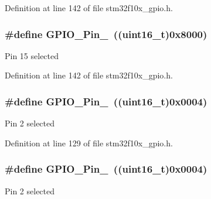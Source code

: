 Definition at line 142 of file stm32f10x\+\_\+gpio.\+h.

\subsubsection[{\texorpdfstring{G\+P\+I\+O\+\_\+\+Pin\+\_\+15}{GPIO_Pin_15}}]{\setlength{\rightskip}{0pt plus 5cm}\#define G\+P\+I\+O\+\_\+\+Pin\+\_~(({\bf uint16\+\_\+t})0x8000)}\hypertarget{group___g_p_i_o__pins__define_gae686a9fc47cf3e420e5db0784210711d}{}\label{group___g_p_i_o__pins__define_gae686a9fc47cf3e420e5db0784210711d}
Pin 15 selected 

Definition at line 142 of file stm32f10x\+\_\+gpio.\+h.

\subsubsection[{\texorpdfstring{G\+P\+I\+O\+\_\+\+Pin\+\_\+2}{GPIO_Pin_2}}]{\setlength{\rightskip}{0pt plus 5cm}\#define G\+P\+I\+O\+\_\+\+Pin\+\_~(({\bf uint16\+\_\+t})0x0004)}\hypertarget{group___g_p_i_o__pins__define_gabdf6630324b2f99360537a310687187c}{}\label{group___g_p_i_o__pins__define_gabdf6630324b2f99360537a310687187c}
Pin 2 selected 

Definition at line 129 of file stm32f10x\+\_\+gpio.\+h.

\subsubsection[{\texorpdfstring{G\+P\+I\+O\+\_\+\+Pin\+\_\+2}{GPIO_Pin_2}}]{\setlength{\rightskip}{0pt plus 5cm}\#define G\+P\+I\+O\+\_\+\+Pin\+\_~(({\bf uint16\+\_\+t})0x0004)}\hypertarget{group___g_p_i_o__pins__define_gabdf6630324b2f99360537a310687187c}{}\label{group___g_p_i_o__pins__define_gabdf6630324b2f99360537a310687187c}
Pin 2 selected 

